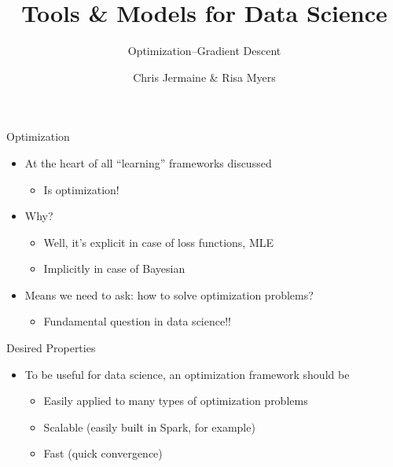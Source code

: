 \documentclass[aspectratio=169]{beamer}
\title[]
{Tools \& Models for Data Science}
\subtitle{Optimization--Gradient Descent}
\author[]{Chris Jermaine \& Risa Myers}
\institute
{
  Rice University 
}
\date[]{}
\begin{document}
\begin{frame}
 \titlepage
\end{frame}
\begin{frame}{Optimization}

\begin{itemize}
\item At the heart of all ``learning'' frameworks discussed
	\begin{itemize}
	\item Is optimization!
	\end{itemize}
\item Why?
	\begin{itemize}
	\item Well, it's explicit in case of loss functions, MLE
	\item Implicitly in case of Bayesian
	\end{itemize}
\item Means we need to ask: how to solve optimization problems?
	\begin{itemize}
	\item Fundamental question in data science!!
	\end{itemize}
\end{itemize}

\end{frame}
\begin{frame}{Desired Properties}

\begin{itemize}
\item To be useful for data science, an optimization framework should be
\begin{itemize}
	\item Easily applied to many types of optimization problems
	\item Scalable (easily built in Spark, for example)
	\item Fast (quick convergence)
\end{itemize}
\end{itemize}

\end{frame}
\end{document}
